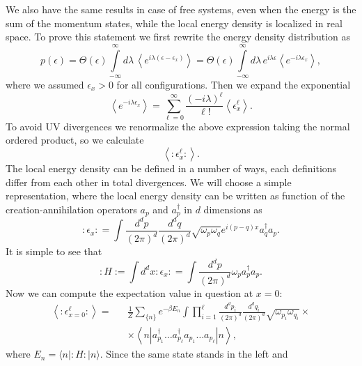 \documentclass[aps,prd,twocolumn,showpacs,superscriptaddress,groupedaddress]{revtex4}  %
\newcommand{\ep}{\epsilon}
\begin{document}
We also have the same results in case of free systems, even when the energy is the sum of the momentum states, while the local
energy density is localized in real space. To prove this statement we
first rewrite the energy density distribution as
\begin{equation}
  p(\epsilon) = \Theta(\epsilon)\! \int\limits_{-\infty}^\infty \!
  d\lambda \, \left\langle e^{i\lambda (\ep-\ep_x)}\right\rangle 
  = \Theta(\epsilon)\! \int\limits_{-\infty}^\infty \!
  d\lambda \,e^{i\lambda \ep} \left\langle e^{-i\lambda\ep_x}\right\rangle,
\end{equation}
where we assumed $\ep_x>0$ for all configurations. Then we expand the
exponential
\begin{equation}
  \left\langle e^{-i\lambda\ep_x}\right\rangle = \sum_{\ell=0}^\infty
  \frac{(-i\lambda)^\ell}{\ell!} \left\langle \ep_x^\ell\right\rangle.
\end{equation}
To avoid UV divergences we renormalize the above expression taking the
normal ordered product, so we calculate
\begin{equation}
  \left\langle : \ep_x^\ell :\right\rangle.
\end{equation}
The local energy density can be defined in a number of ways, each
definitions differ from each other in total divergences. We will
choose a simple representation, where the local energy density can be
written as function of the creation-annihilation operators $a_p$ and
$a^\dagger_p$ in  $d$ dimensions as
\begin{equation}
  :\ep_x: = \int \frac{d^dp}{(2\pi)^d}\frac{d^dq}{(2\pi)^d} \sqrt{\omega_p\omega_q}
  e^{i(p-q)x} a_q^\dagger a_p.
\end{equation}
It is simple to see that 
\begin{equation}
  :H:=\int d^dx :\ep_x: =  \int\frac{d^dp}{(2\pi)^d} \omega_p a_p^\dagger a_p.
\end{equation}
Now we can compute the expectation value in question at \mbox{$x=0$}:
\begin{eqnarray}
   \left\langle : \ep_{x=0}^\ell :\right\rangle 
  =&& \frac1Z\sum_{\{n\}} e^{-\beta E_n}\int 
   \prod_{i=1}^\ell \frac{d^dp_i}{(2\pi)^d}\frac{d^dq_i}{(2\pi)^d}
   \sqrt{\omega_{p_i}\omega_{q_i}}\times\nonumber\\
  &&\times \left\langle n\left| a^\dagger_{p_1}\dots
       a^\dagger_{p_\ell} a_{p_1}\dots a_{p_\ell}\right|
     n\right\rangle,
\end{eqnarray}
where $E_n=\langle n| :H:|n\rangle$. Since the same state stands in the left and
\end{document}
